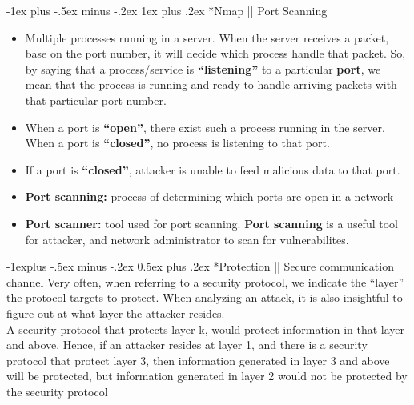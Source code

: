 \documentclass[10pt,landscape]{article}
\makeatletter
\renewcommand{\subsection}{\@startsection{subsection}{2}{0mm}%
                                {-1explus -.5ex minus -.2ex}%
                                {0.5ex plus .2ex}%
                                {\normalfont\normalsize\bfseries}}
\renewcommand{\subsubsection}{\@startsection{subsubsection}{3}{0mm}%
                                {-1ex plus -.5ex minus -.2ex}%
                                {1ex plus .2ex}%
                                {\normalfont\small\bfseries}}
\makeatother
\begin{document}
\begin{multicols*}{3}
\subsubsection*{Nmap || Port Scanning}
\begin{itemize}[noitemsep,wide=0pt, leftmargin=\dimexpr{} + 2\relax]
    \item Multiple processes running in a server. When the server receives a packet, base on the port number, it will decide which process
    handle that packet. So, by saying that a process/service is \textbf{“listening”} to a particular \textbf{port}, we mean that the
    process is running and ready to handle arriving packets with that particular port number.
    \item When a port is \textbf{“open”}, there exist such a process running in the server. When a port is \textbf{“closed”}, no process is
    listening to that port.
    \item If a port is \textbf{“closed”}, attacker is unable to feed malicious data to that port.
\end{itemize}

\begin{itemize}[noitemsep,wide=0pt, leftmargin=\dimexpr{} + 2\relax]
    \item \textbf{Port scanning:} process of determining which ports are open in a network
    \item \textbf{Port scanner:} tool used for port scanning. \textbf{Port scanning} is a useful tool for attacker, and network administrator to scan for vulnerabilites.
\end{itemize}

\subsection*{Protection || Secure communication channel}
Very often, when referring to a security protocol, we indicate the “layer” the
protocol targets to protect. When analyzing an attack, it is also insightful to figure out at what layer the
attacker resides. \\ 

A security protocol that protects layer k, would protect information in that
layer and above. Hence, if an attacker resides at layer 1, and there is a security protocol
that protect layer 3, then information generated in layer 3 and above will
be protected, but information generated in layer 2 would not be protected
by the security protocol 


\end{multicols*}
\end{document}
